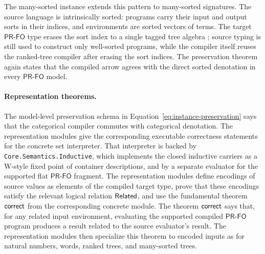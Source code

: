 \documentclass[sigplan,10pt,anonymous,review,screen]{acmart}
\newcommand{\PRFO}{\ensuremath{\mathsf{PR\mbox{-}FO}}}
\newcommand{\AgdaFile}[1]{\texttt{#1}}
\begin{document}
The many-sorted instance extends this pattern to many-sorted signatures.
The source language is intrinsically sorted: programs carry their input
and output sorts in their indices, and environments are sorted vectors of
terms.  The target \PRFO{} type erases the sort index to a single tagged
tree algebra ; source typing is still used to
construct only well-sorted programs, while the compiler itself reuses the
ranked-tree compiler after erasing the sort indices.  The preservation
theorem again states that the compiled arrow agrees with the direct
sorted denotation in every \PRFO{} model.

\paragraph{Representation theorems.}
The model-level preservation schema in
Equation~\ref{eq:instance-preservation} says that the categorical
compiler commutes with categorical denotation.  The representation
modules give the corresponding executable correctness statements for the
concrete set interpreter.  That interpreter is backed by
\AgdaFile{Core.Semantics.Inductive}, which implements the closed
inductive carriers as a W-style fixed point of container descriptions,
and by a separate evaluator for the supported flat \PRFO{} fragment.  The
representation modules define encodings of source values as elements of
the compiled target type, prove that these encodings satisfy the relevant
logical relation \(\AgdaFunction{Related}\), and use the fundamental
theorem \(\AgdaFunction{correct}\) from the corresponding concrete module.
The theorem \(\AgdaFunction{correct}\) says that, for any related input
environment, evaluating the supported compiled \PRFO{} program produces a
result related to the source evaluator's result.  The representation
modules then specialize this theorem to encoded inputs as
 for natural numbers,
words, ranked trees, and many-sorted trees.
\end{document}
